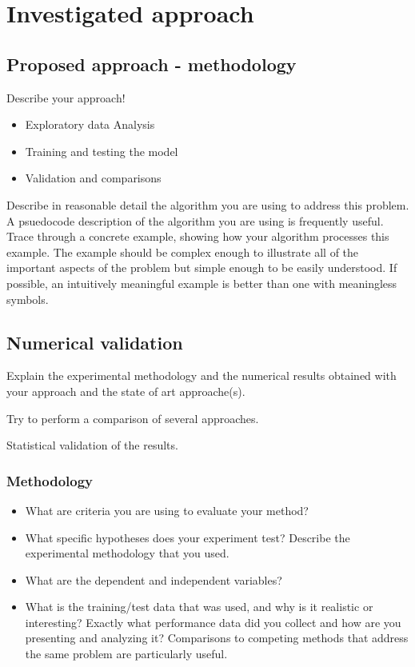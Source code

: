 
\chapter{Investigated approach}
\label{chapter:proposedApproach}

\section{Proposed approach - methodology}
\label{section:ProposedApproach}

Describe your approach!

\begin{itemize}
	\item Exploratory data Analysis
	\item Training and testing the model
	\item Validation and comparisons
\end{itemize}

Describe in reasonable detail the algorithm you are using to address this problem. A psuedocode description of the algorithm you are using is frequently useful. Trace through a concrete example, showing how your algorithm processes this example. The example should be complex enough to illustrate all of the important aspects of the problem but simple enough to be easily understood. If possible, an intuitively meaningful example is better than one with meaningless symbols.


\section{Numerical validation}
\label{section:numericalValidaion}


Explain the experimental methodology and the numerical results obtained with your approach and the state of art approache(s).

Try to perform a comparison of several approaches.

Statistical validation of the results.


\subsection{Methodology}
\label{section:methodology}

\begin{itemize}
	\item What are criteria you are using to evaluate your method? 
	\item What specific hypotheses does your experiment test? Describe the experimental methodology that you used. 
	\item What are the dependent and independent variables? 
	\item What is the training/test data that was used, and why is it realistic or interesting? Exactly what performance data did you collect and how are you presenting and analyzing it? Comparisons to competing methods that address the same problem are particularly useful.
\end{itemize}

